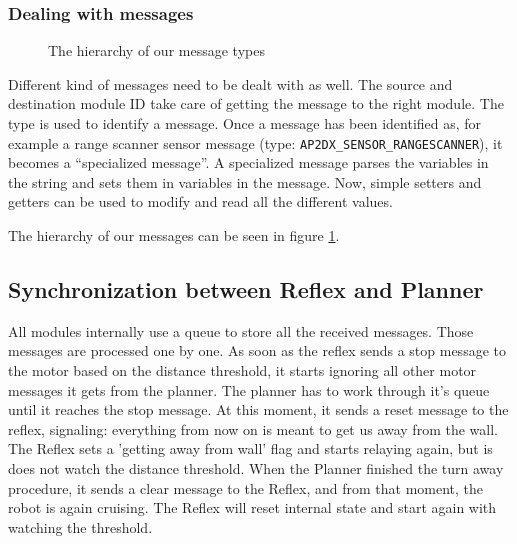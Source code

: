 \subsubsection{Dealing with messages}
\begin{figure}
\centerline{
}
\caption{The hierarchy of our message types}
\label{fig:messageHierarchy}
\end{figure}
Different kind of messages need to be dealt with as well. The source and destination module ID take care
of getting the message to the right module. The type is used to identify a message. Once a message
has been identified as, for example a range scanner sensor message (type:
\texttt{AP2DX\_SENSOR\_RANGESCANNER}), 
it becomes a ``specialized message''. 
A specialized message parses the variables in the string and sets them in variables in the message. Now,
simple setters and getters can be used to modify and read all the different
values.

The hierarchy of our messages can be seen in figure \ref{fig:messageHierarchy}. 



\subsection{Synchronization between Reflex and Planner}
All modules internally use a queue to store all the received messages. Those messages are processed one by one. As soon as the reflex sends a stop message to the motor based on the distance threshold, it starts ignoring all other motor messages it gets from the planner. The planner has to work through it's queue until it reaches the stop message. At this moment, it sends a reset message to the reflex, signaling: everything from now on is meant to get us away from the wall. The Reflex sets a 'getting away from wall' flag and starts relaying again, but is does not watch the distance threshold. When the Planner finished the turn away procedure, it sends a clear message to the Reflex, and from that moment, the robot is again cruising. The Reflex will reset internal state and start again with watching the threshold.

